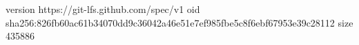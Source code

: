 version https://git-lfs.github.com/spec/v1
oid sha256:826fb60ac61b34070dd9c36042a46e51e7ef985fbe5c8f6ebf67953e39c28112
size 435886
